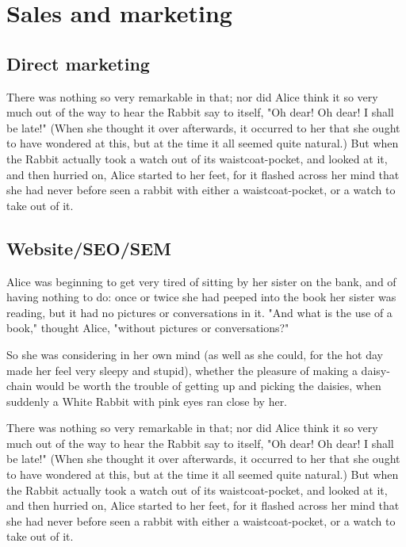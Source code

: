 \documentclass[12pt]{article}
\begin{document}
\section{Sales and marketing}
\label{sec:orgheadline40}

\subsection{Direct marketing}
\label{sec:orgheadline25}
There was nothing so very remarkable in that; nor did Alice think it so very much out of the way to hear the Rabbit say to itself, "Oh dear! Oh dear! I shall be late!" (When she thought it over afterwards, it occurred to her that she ought to have wondered at this, but at the time it all seemed quite natural.) But when the Rabbit actually took a watch out of its waistcoat-pocket, and looked at it, and then hurried on, Alice started to her feet, for it flashed across her mind that she had never before seen a rabbit with either a waistcoat-pocket, or a watch to take out of it. 

\subsection{Website/SEO/SEM}
\label{sec:orgheadline26}
Alice was beginning to get very tired of sitting by her sister on the bank, and of having nothing to do: once or twice she had peeped into the book her sister was reading, but it had no pictures or conversations in it. "And what is the use of a book," thought Alice, "without pictures or conversations?" 

So she was considering in her own mind (as well as she could, for the hot day made her feel very sleepy and stupid), whether the pleasure of making a daisy-chain would be worth the trouble of getting up and picking the daisies, when suddenly a White Rabbit with pink eyes ran close by her.

There was nothing so very remarkable in that; nor did Alice think it so very much out of the way to hear the Rabbit say to itself, "Oh dear! Oh dear! I shall be late!" (When she thought it over afterwards, it occurred to her that she ought to have wondered at this, but at the time it all seemed quite natural.) But when the Rabbit actually took a watch out of its waistcoat-pocket, and looked at it, and then hurried on, Alice started to her feet, for it flashed across her mind that she had never before seen a rabbit with either a waistcoat-pocket, or a watch to take out of it. 
\end{document}
